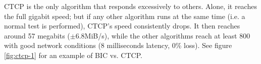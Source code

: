 \documentclass{article}
\begin{document}
\begin{figure}[H]
\end{figure}

CTCP is the only algorithm that responds excessively to others. Alone, it
reaches the full gigabit speed; but if any other algorithm runs at the same
time (i.e. a normal test is performed), CTCP's speed consistently drops. It
then reaches around 57 megabits ($\pm$6.8MiB/s), while the other algorithms reach at
least 800 with good network conditions (8 milliseconds latency, 0\% loss).
See figure \ref{fig:ctcp-1} for an example of BIC vs. CTCP.
\end{document}
